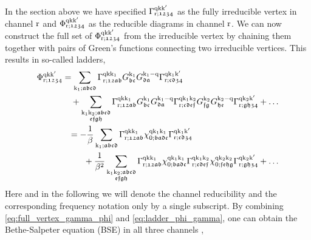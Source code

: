 \documentclass[../../main.tex]{subfiles}
\begin{document}
In the section above we have specified $\Gamma_{\text{r};\mathfrak{1234}}^{\text{q}\text{k}\text{k}'}$ as the fully irreducible vertex in channel $\text{r}$ and $\Phi_{\text{r};\mathfrak{1234}}^{\text{q}\text{k}\text{k}'}$	as the reducible diagrams in channel $\text{r}$. We can now construct the full set of $\Phi_{\text{r};\mathfrak{1234}}^{\text{q}\text{k}\text{k}'}$ from the irreducible vertex by chaining them together with pairs of Green's functions connecting two irreducible vertices. This results in so-called ladders, 
\begin{subequations}\label{eq:ladder_phi_gamma}
\begin{align}
\begin{split}
	\Phi_{\text{r};\mathfrak{1234}}^{\text{q}\text{k}\text{k}'}&=\sum_{\text{k}_1;\mathfrak{abcd}} \Gamma_{\text{r};\mathfrak{12ab}}^{\text{q}\text{k}\text{k}_1} G_{\mathfrak{bc}}^{\text{k}_1} G_{\mathfrak{da}}^{\text{k}_1-\text{q}} \Gamma_{\text{r};\mathfrak{cd34}}^{\text{q}\text{k}_1\text{k}'}\\
	&\quad+\sum_{\substack{\text{k}_1\text{k}_2;\mathfrak{abcd}\\\mathfrak{efgh}}} \Gamma_{\text{r};\mathfrak{12ab}}^{\text{q}\text{k}\text{k}_1} G_{\mathfrak{bc}}^{\text{k}_1} G_{\mathfrak{da}}^{\text{k}_1-\text{q}} \Gamma_{\text{r};\mathfrak{cdef}}^{\text{q}\text{k}_1\text{k}_2} G_{\mathfrak{fg}}^{\text{k}_2} G_{\mathfrak{he}}^{\text{k}_2-\text{q}} \Gamma_{\text{r};\mathfrak{gh34}}^{\text{q}\text{k}_2\text{k}'} + \dots
\end{split}\\
\begin{split}
	&=-\frac1\beta\sum_{\text{k}_1;\mathfrak{abcd}} \Gamma_{\text{r};\mathfrak{12ab}}^{\text{q}\text{k}\text{k}_1} \chi^{\text{q}\text{k}_1\text{k}_1}_{0;\mathfrak{badc}} \Gamma_{\text{r};\mathfrak{cd34}}^{\text{q}\text{k}_1\text{k}'}\\
	&\phantom{-}\quad+\frac{1}{\beta^2}\sum_{\substack{\text{k}_1\text{k}_2;\mathfrak{abcd}\\\mathfrak{efgh}}} \Gamma_{\text{r};\mathfrak{12ab}}^{\text{q}\text{k}\text{k}_1} \chi^{\text{q}\text{k}_1\text{k}_1}_{0;\mathfrak{badc}} \Gamma_{\text{r};\mathfrak{cdef}}^{\text{q}\text{k}_1\text{k}_2} \chi^{\text{q}\text{k}_2\text{k}_2}_{0;\mathfrak{fehg}} \Gamma_{\text{r};\mathfrak{gh34}}^{\text{q}\text{k}_2\text{k}'} + \dots
\end{split}
\end{align}
\end{subequations}
Here and in the following we will denote the channel reducibility and the corresponding frequency notation only by a single subscript. By combining \eqref{eq:full_vertex_gamma_phi} and \eqref{eq:ladder_phi_gamma}, one can obtain the Bethe-Salpeter equation (BSE) in all three channels \cite{a relativistic equation for bound-state, nambu paper, rohringer thesis maybe},
\end{document}
